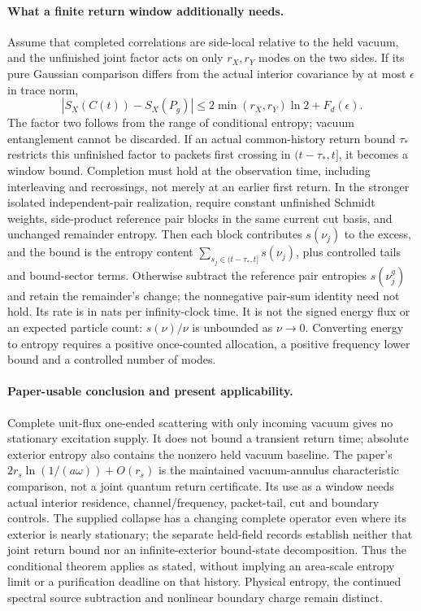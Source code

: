 \documentclass[11pt]{article}
\begin{document}
\paragraph{What a finite return window additionally needs.}
Assume that completed correlations are side-local relative to the held
vacuum, and the unfinished joint factor acts on only \(r_X,r_Y\)
modes on the two sides.  If its pure Gaussian comparison differs from
the actual interior covariance by at most \(\epsilon\) in trace norm,
\[
 \left|S_X(C(t))-S_X(P_g)\right|
 \le 2\min(r_X,r_Y)\ln2+F_d(\epsilon).
\]
The factor two follows from the range of conditional entropy; vacuum
entanglement cannot be discarded.  If an actual common-history return
bound \(\tau_*\) restricts this unfinished factor to packets first
crossing in \((t-\tau_*,t]\), it becomes a window bound.  Completion
must hold at the observation time, including interleaving and recrossings,
not merely at an earlier first return.  In the stronger isolated
independent-pair realization, require constant unfinished Schmidt
weights, side-product reference pair blocks in the same current cut
basis, and unchanged remainder entropy.  Then each block contributes
\(s(\nu_j)\) to the excess, and the bound is the entropy content
\(\sum_{s_j\in(t-\tau_*,t]}s(\nu_j)\), plus controlled tails and
bound-sector terms.  Otherwise subtract the reference pair entropies
\(s(\nu_j^g)\) and retain the remainder's change; the nonnegative
pair-sum identity need not hold.  Its rate is in nats per infinity-clock time.
It is not the signed energy flux or an expected particle count:
\(s(\nu)/\nu\) is unbounded as \(\nu\to0\).  Converting energy
to entropy requires a positive once-counted allocation, a positive
frequency lower bound and a controlled number of modes.

\paragraph{Paper-usable conclusion and present applicability.}
Complete unit-flux one-ended scattering with only incoming vacuum
gives no stationary excitation supply.  It does not bound a transient
return time; absolute exterior entropy also contains the nonzero held
vacuum baseline.  The paper's
\(2r_s\ln(1/(a\omega))+O(r_s)\) is the maintained vacuum-annulus
characteristic comparison, not a joint quantum return certificate.
Its use as a window needs actual interior residence, channel/frequency,
packet-tail, cut and boundary controls.  The supplied collapse has a
changing complete operator even where its exterior is nearly stationary;
the separate held-field records establish neither that joint return
bound nor an infinite-exterior bound-state decomposition.  Thus the
conditional theorem applies as stated, without implying an area-scale
entropy limit or a purification deadline on that history.  Physical
entropy, the continued spectral source subtraction and nonlinear
boundary charge remain distinct.
\end{document}
